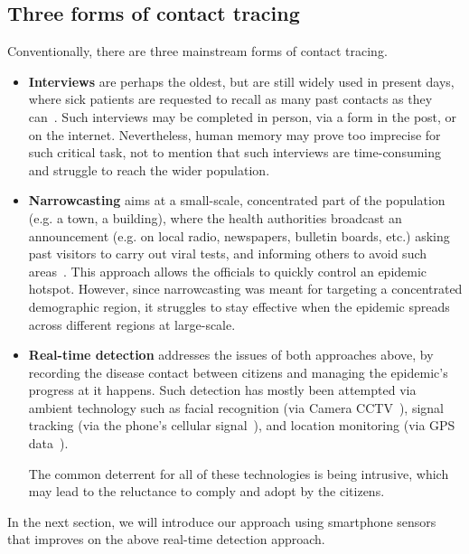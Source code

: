 \documentclass[graybox]{svmult}
\begin{document}
\subsection{Three forms of contact tracing}
Conventionally, there are three mainstream forms of contact tracing.
\begin{itemize}
    \item \textbf{Interviews} are perhaps the oldest, but are still widely used in present days, where sick patients are requested to recall as many past contacts as they can~\cite{swanson2018contact}. Such interviews may be completed in person, via a form in the post, or on the internet. Nevertheless, human memory may prove too imprecise for such critical task, not to mention that such interviews are time-consuming and struggle to reach the wider population.
    
    \item \textbf{Narrowcasting} aims at a small-scale, concentrated part of the population (e.g. a town, a building), where the health authorities broadcast an announcement (e.g. on local radio, newspapers, bulletin boards, etc.) asking past visitors to carry out viral tests, and informing others to avoid such areas~\cite{kaligotla2016impact}. This approach allows the officials to quickly control an epidemic hotspot. However, since narrowcasting was meant for targeting a concentrated demographic region, it struggles to stay effective when the epidemic spreads across different regions at large-scale.
    
    \item \textbf{Real-time detection} addresses the issues of both approaches above, by recording the disease contact between citizens and managing the epidemic's progress at it happens. Such detection has mostly been attempted via ambient technology such as facial recognition (via Camera CCTV~\cite{hou2017human,wang2017tracking}), signal tracking (via the phone's cellular signal~\cite{aziz2016smart}), and location monitoring (via GPS data~\cite{chaix2018mobile,olu2016contact,stanley2020limits}).
    
    The common deterrent for all of these technologies is being intrusive, which may lead to the reluctance to comply and adopt by the citizens.
\end{itemize}

In the next section, we will introduce our approach using smartphone sensors that improves on the above real-time detection approach.


\end{document}

